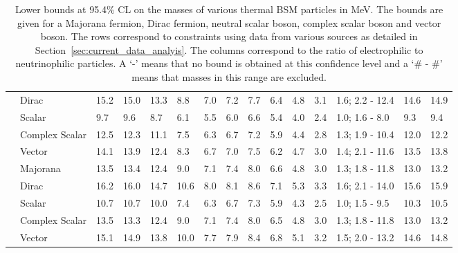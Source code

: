 \documentclass[notitlepage,letterpaper,natbib,aps,prd,onecolumn,amsmath,amsfonts,nofootinbib,preprintnumbers,superscriptaddress,secnumarabic,groupedaddress]{revtex4-1}
\begin{document}
\begin{table}[h]
{\begin{tabular}{c|l|p{0.7cm}|p{0.7cm}|p{0.7cm}|p{0.7cm}|p{0.7cm}|p{0.7cm}|p{0.7cm}|p{0.7cm}|p{0.7cm}|p{0.7cm}|p{2.08cm}|p{2.08cm}|p{0.7cm}}
                          & Dirac         & \hfil 15.2  & \hfil 15.0 & \hfil 13.3 & \hfil 8.8 & \hfil 7.0 & \hfil 7.2 & \hfil 7.7 & \hfil 6.4 & \hfil 4.8 & \hfil 3.1 & \hfil 1.6; 2.2 - 12.4 & \hfil 14.6 & \hfil 14.9 \\
                          & Scalar & \hfil 9.7  & \hfil 9.6 & \hfil 8.7 & \hfil 6.1 & \hfil 5.5 & \hfil 6.0 & \hfil 6.6 & \hfil 5.4 & \hfil 4.0 & \hfil 2.4 & \hfil 1.0; 1.6 - 8.0 & \hfil 9.3 & \hfil 9.4 \\
                          & Complex Scalar & \hfil 12.5  & \hfil 12.3 & \hfil 11.1 & \hfil 7.5 & \hfil 6.3 & \hfil 6.7 & \hfil 7.2 & \hfil 5.9 & \hfil 4.4 & \hfil 2.8 & \hfil 1.3; 1.9 - 10.4 & \hfil 12.0 & \hfil 12.2 \\
                          & Vector         & \hfil 14.1  & \hfil 13.9 & \hfil 12.4 & \hfil 8.3 & \hfil 6.7 & \hfil 7.0 & \hfil 7.5 & \hfil 6.2 & \hfil 4.7 & \hfil 3.0 & \hfil 1.4; 2.1 - 11.6 & \hfil 13.5 & \hfil 13.8 \\
                        \hline
\parbox[t]{5mm}{}     & Majorana     & \hfil 13.5 & \hfil 13.4 & \hfil 12.4 & \hfil 9.0 & \hfil 7.1 & \hfil 7.4 & \hfil 8.0 & \hfil 6.6 & \hfil 4.8 & \hfil 3.0 & \hfil 1.3; 1.8 - 11.8 & \hfil 13.0 & \hfil 13.2 \\
                          & Dirac         & \hfil 16.2  & \hfil 16.0 & \hfil 14.7 & \hfil 10.6 & \hfil 8.0 & \hfil 8.1 & \hfil 8.6 & \hfil 7.1 & \hfil 5.3 & \hfil 3.3 & \hfil 1.6; 2.1 - 14.0 & \hfil 15.6 & \hfil 15.9 \\
                          & Scalar & \hfil 10.7 & \hfil 10.7 & \hfil 10.0 & \hfil 7.4 & \hfil 6.3 & \hfil 6.7 & \hfil 7.3 & \hfil 5.9 & \hfil 4.3 & \hfil 2.5 & \hfil 1.0; 1.5 - 9.5 & \hfil 10.3 & \hfil 10.5 \\
                          & Complex Scalar & \hfil 13.5 & \hfil 13.3 & \hfil 12.4 & \hfil 9.0 & \hfil 7.1 & \hfil 7.4 & \hfil 8.0 & \hfil 6.5 & \hfil 4.8 & \hfil 3.0 & \hfil 1.3; 1.8 - 11.8 & \hfil 13.0 & \hfil 13.2 \\
                          & Vector         & \hfil 15.1  & \hfil 14.9 & \hfil 13.8 & \hfil 10.0 & \hfil 7.7 & \hfil 7.9 & \hfil 8.4 & \hfil 6.8 & \hfil 5.1 & \hfil 3.2 & \hfil 1.5; 2.0 - 13.2 & \hfil 14.6 & \hfil 14.8 \\
                        \hline\hline    
\end{tabular}
}
\caption{Lower bounds at 95.4\% CL on the masses of various thermal BSM particles in MeV. The bounds are given for a Majorana fermion, Dirac fermion, neutral scalar boson, complex scalar boson and vector boson.
The rows correspond to constraints using data from various sources as detailed in Section~\ref{sec:current_data_analyis}.
The columns correspond to the ratio of electrophilic to neutrinophilic particles. A `-' means that no bound is obtained at this confidence level and a `\# - \#' means that masses in this range are excluded.}
\label{tab:BRBounds}
\end{table}
\end{document}
